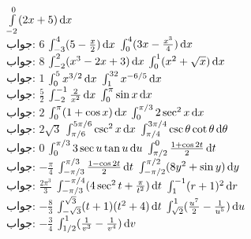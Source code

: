 $\int\limits_{-2}^0(2x+5)\dif x$\\
جواب:\quad
$6$
$\int_{-3}^4(5-\tfrac{x}{2})\dif x$
$\int_0^4(3x-\tfrac{x^3}{4})\dif x$\\
جواب:\quad
$8$
$\int_{-2}^2(x^3-2x+3)\dif x$
$\int_0^1(x^2+\sqrt{x})\dif x$\\
جواب:\quad
$1$
$\int_0^5x^{3/2}\dif x$
$\int_1^{32}x^{-6/5}\dif x$\\
جواب:\quad
$\tfrac{5}{2}$
$\int_{-2}^{-1}\tfrac{2}{x^2}\dif x$
$\int_0^{\pi}\sin x\dif x$\\
جواب:\quad
$2$
$\int_0^{\pi}(1+\cos x)\dif x$
$\int_0^{\pi/3}2\sec^2x\dif x$\\
جواب:\quad
$2\sqrt{3}$
$\int_{\pi/6}^{5\pi/6}\csc^2x\dif x$
$\int_{\pi/4}^{3\pi/4}\csc\theta\cot\theta\dif\theta$\\
جواب:\quad
$0$
$\int_0^{\pi/3}3\sec u\tan u\dif u$
$\int_{\pi/2}^0\tfrac{1+\cos 2t}{2}\dif t$\\
جواب:\quad
$-\tfrac{\pi}{4}$
$\int_{-\pi/3}^{\pi/3}\tfrac{1-\cos 2t}{2}\dif t$
$\int_{-\pi/2}^{\pi/2}(8y^2+\sin y)\dif y$\\
جواب:\quad
$\tfrac{2\pi^3}{3}$
$\int_{-\pi/3}^{-\pi/4}(4\sec^2t+\tfrac{\pi}{t^2})\dif t$
$\int_1^{-1}(r+1)^2\dif r$\\
جواب:\quad
$-\tfrac{8}{3}$
$\int_{-\sqrt{3}}^{\sqrt{3}}(t+1)(t^2+4)\dif t$
$\int_{\sqrt{2}}^1(\tfrac{u^7}{2}-\tfrac{1}{u^5})\dif u$\\
جواب:\quad
$-\tfrac{3}{4}$
$\int_{1/2}^1(\tfrac{1}{v^3}-\tfrac{1}{v^4})\dif v$
